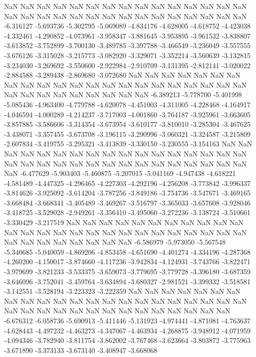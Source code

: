 NaN
NaN
NaN
NaN
NaN
NaN
NaN
NaN
NaN
NaN
NaN
NaN
NaN
NaN
NaN
NaN
NaN
NaN
NaN
NaN
NaN
NaN
NaN
NaN
NaN
NaN
NaN
NaN
NaN
NaN
-6.316127
-5.693736
-5.302795
-5.069089
-4.834176
-4.628005
-4.618752
-4.423038
-4.332461
-4.290852
-4.073961
-3.958347
-3.881645
-3.953895
-3.961532
-3.838807
-3.613852
-3.752899
-3.700130
-3.489785
-3.397788
-3.466549
-3.236049
-3.557555
-3.676126
-3.315028
-3.215773
-3.082920
-3.329071
-3.352214
-3.560639
-3.132815
-3.234030
-3.269692
-3.550600
-2.922984
-2.910709
-3.131395
-2.812141
-3.020022
-2.884588
-3.289438
-2.869680
-3.072680
NaN
NaN
NaN
NaN
NaN
NaN
NaN
NaN
NaN
NaN
NaN
NaN
NaN
NaN
NaN
NaN
NaN
NaN
NaN
NaN
NaN
NaN
NaN
NaN
NaN
NaN
NaN
NaN
NaN
NaN
NaN
-6.389213
-5.778700
-5.401998
-5.085436
-4.963400
-4.779788
-4.620078
-4.451003
-4.311005
-4.228468
-4.164917
-4.046594
-4.000289
-4.214237
-3.717003
-4.001860
-3.764187
-3.925961
-3.663605
-3.857885
-3.586606
-3.314354
-3.673954
-3.610177
-3.810010
-3.285304
-3.467625
-3.438071
-3.357455
-3.673708
-3.196115
-3.290996
-3.060321
-3.324587
-3.215809
-2.607834
-3.419755
-3.295321
-3.413839
-3.330150
-3.230555
-3.154163
NaN
NaN
NaN
NaN
NaN
NaN
NaN
NaN
NaN
NaN
NaN
NaN
NaN
NaN
NaN
NaN
NaN
NaN
NaN
NaN
NaN
NaN
NaN
NaN
NaN
NaN
NaN
NaN
NaN
NaN
NaN
NaN
NaN
-6.477629
-5.903403
-5.460875
-5.207015
-5.041169
-4.947438
-4.618221
-4.581489
-4.447325
-4.296465
-4.227303
-4.292196
-4.256208
-3.773842
-3.996337
-3.814626
-3.925092
-3.614204
-3.787256
-3.849186
-3.754736
-3.547671
-3.469165
-3.668484
-3.668341
-3.405489
-3.469267
-3.516797
-3.365033
-3.657608
-3.928046
-3.418725
-3.529028
-2.949261
-3.356410
-3.495060
-3.272236
-3.138724
-3.510661
-3.330429
-3.217519
NaN
NaN
NaN
NaN
NaN
NaN
NaN
NaN
NaN
NaN
NaN
NaN
NaN
NaN
NaN
NaN
NaN
NaN
NaN
NaN
NaN
NaN
NaN
NaN
NaN
NaN
NaN
NaN
NaN
NaN
NaN
NaN
NaN
NaN
-6.586979
-5.973050
-5.567548
-5.340685
-5.040059
-4.869206
-4.853458
-4.651690
-4.401274
-4.334196
-4.287368
-4.260200
-4.150017
-3.874660
-4.117236
-3.942834
-4.124931
-3.743766
-3.822471
-3.979699
-3.821233
-3.533375
-3.659073
-3.779695
-3.779728
-3.396180
-3.687359
-3.646096
-3.752041
-3.459764
-3.634894
-3.680327
-2.981521
-3.399332
-3.518581
-3.142551
-3.528194
-3.223323
-3.222359
NaN
NaN
NaN
NaN
NaN
NaN
NaN
NaN
NaN
NaN
NaN
NaN
NaN
NaN
NaN
NaN
NaN
NaN
NaN
NaN
NaN
NaN
NaN
NaN
NaN
NaN
NaN
NaN
NaN
NaN
NaN
NaN
NaN
NaN
NaN
NaN
-6.676312
-6.058736
-5.690913
-5.411446
-5.131923
-4.974441
-4.871081
-4.763637
-4.628443
-4.497232
-4.463273
-4.347067
-4.463934
-4.268875
-3.948912
-4.071959
-4.094346
-3.782940
-3.811754
-3.862002
-3.767468
-3.623664
-3.803872
-3.775963
-3.671890
-3.373133
-3.673140
-3.408947
-3.668068
